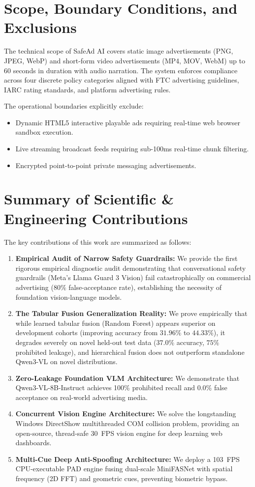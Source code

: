 \documentclass[12pt,a4paper]{report}
\begin{document}
\section{Scope, Boundary Conditions, and Exclusions}

The technical scope of SafeAd AI covers static image advertisements (PNG, JPEG, WebP) and short-form video advertisements (MP4, MOV, WebM) up to 60 seconds in duration with audio narration. The system enforces compliance across four discrete policy categories aligned with FTC advertising guidelines, IARC rating standards, and platform advertising rules.

The operational boundaries explicitly exclude:
\begin{itemize}
    \item Dynamic HTML5 interactive playable ads requiring real-time web browser sandbox execution.
    \item Live streaming broadcast feeds requiring sub-100ms real-time chunk filtering.
    \item Encrypted point-to-point private messaging advertisements.
\end{itemize}

\section{Summary of Scientific \& Engineering Contributions}

The key contributions of this work are summarized as follows:
\begin{enumerate}
    \item \textbf{Empirical Audit of Narrow Safety Guardrails:} We provide the first rigorous empirical diagnostic audit demonstrating that conversational safety guardrails (Meta's Llama Guard 3 Vision) fail catastrophically on commercial advertising ($80\%$ false-acceptance rate), establishing the necessity of foundation vision-language models.
    \item \textbf{The Tabular Fusion Generalization Reality:} We prove empirically that while learned tabular fusion (Random Forest) appears superior on development cohorts (improving accuracy from $31.96\%$ to $44.33\%$), it degrades severely on novel held-out test data ($37.0\%$ accuracy, $75\%$ prohibited leakage), and hierarchical fusion does not outperform standalone Qwen3-VL on novel distributions.
    \item \textbf{Zero-Leakage Foundation VLM Architecture:} We demonstrate that Qwen3-VL-8B-Instruct achieves 100\% prohibited recall and 0.0\% false acceptance on real-world advertising media.
    \item \textbf{Concurrent Vision Engine Architecture:} We solve the longstanding Windows DirectShow multithreaded COM collision problem, providing an open-source, thread-safe 30~FPS vision engine for deep learning web dashboards.
    \item \textbf{Multi-Cue Deep Anti-Spoofing Architecture:} We deploy a 103~FPS CPU-executable PAD engine fusing dual-scale MiniFASNet with spatial frequency (2D FFT) and geometric cues, preventing biometric bypass.
\end{enumerate}
\end{document}
